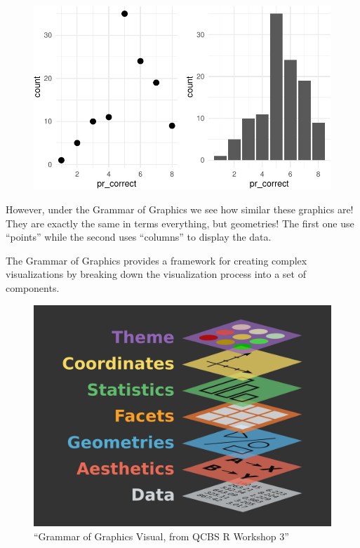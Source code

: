 \documentclass[
  letterpaper,
]{book}
\begin{document}
\begin{figure}[H]

{\centering \includegraphics{./data_viz_files/figure-pdf/unnamed-chunk-4-1.pdf}

}

\end{figure}

However, under the Grammar of Graphics we see how similar these graphics
are! They are exactly the same in terms everything, but geometries! The
first one use ``points'' while the second uses ``columns'' to display
the data.

The Grammar of Graphics provides a framework for creating complex
visualizations by breaking down the visualization process into a set of
components.

\begin{figure}

{\centering \includegraphics{./images/Grammar_of_Graphics.png}

}

\caption{``Grammar of Graphics Visual, from QCBS R Workshop 3''}

\end{figure}
\end{document}
